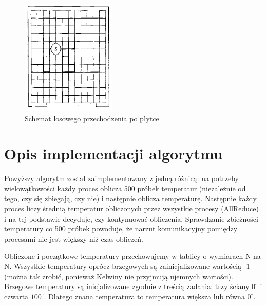 \documentclass[11pt,a4paper]{article}
\begin{document}
\begin{figure}[H]
\begin{center}
\includegraphics[width=0.4\textwidth]{random_walk.png}
\caption{Schemat losowego przechodzenia po płytce}
\end{center}
\end{figure}

\section{Opis implementacji algorytmu}
Powyższy algorytm został zaimplementowany z jedną różnicą: na potrzeby wielowątkowości każdy proces oblicza 500 próbek temperatur (niezależnie od tego, czy się zbiegają, czy nie) i następnie oblicza temperaturę. Następnie każdy proces liczy średnią temperatur obliczonych przez wszystkie procesy (AllReduce) i na tej podstawie decyduje, czy kontynuować obliczenia. Sprawdzanie zbieżności temperatury co 500 próbek powoduje, że narzut komunikacyjny pomiędzy procesami nie jest większy niż czas obliczeń.

Obliczone i początkowe temperatury przechowujemy w tablicy o wymiarach N na N. Wszystkie temperatury oprócz brzegowych są zainicjalizowane wartością -1 (można tak zrobić, ponieważ Kelwiny nie przyjmują ujemnych wartości). Brzegowe temperatury są inicjalizowane zgodnie z treścią zadania: trzy ściany $0^{\circ}$ i czwarta $100^{\circ}$. Dlatego znana temperatura to temperatura większa lub równa $0^{\circ}$.
\end{document}
